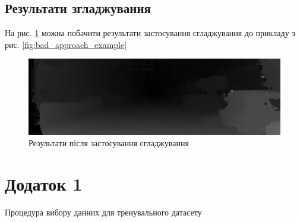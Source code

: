 \documentclass[11pt]{article}
\theoremstyle{definition}
\begin{document}
\subsection{Результати згладжування}
На рис. \ref{fig:smoothing_result} можна побачити результати застосування сгладжування до прикладу з рис. \ref{fig:bad_approach_example}
\begin{figure}[h]
	\includegraphics[width=\linewidth]{smoothing_result}
	\centering
	\caption{Результати після застосування сгладжування}
	\label{fig:smoothing_result}
\end{figure}

\newpage

\printbibliography 

\newpage

\section*{Додаток 1}
Процедура вибору данних для тренувального датасету

\end{document}
